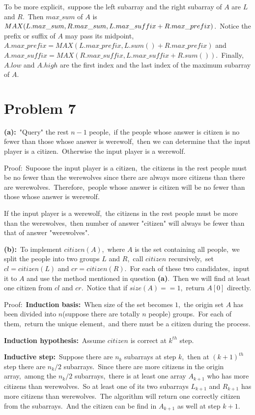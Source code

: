 \documentclass[]{article}
\begin{document}
	To be more explicit,\ suppose the left subarray and the right subarray of $A$ are $L$ and $R$.\ Then $max\_sum$ of $A$ is $MAX(L.max\_sum, R.max\_sum,\\L.max\_suffix+R.max\_prefix)$.\ Notice the prefix or suffix of $A$ may pass its midpoint,\\$A.max\_prefix = MAX(L.max\_prefix, L.sum()+R.max\_prefix)$ and \\$A.max\_suffix = MAX(R.max\_suffix, L.max\_suffix+R.sum())$.\ Finally,\ $A.low$ and $A.high$ are the first index and the last index of the maximum subarray of $A$. 
	
	\section{Problem 7}
	\textbf{(a):}\ "Query" the rest $n-1$ people,\ if the people whose answer is citizen is no fewer than those whose answer is werewolf,\ then we can determine that the input player is a citizen.\ Otherwise the input player is a werewolf.
	
	Proof:\  Supoose the input player is a citizen,\ the citizens in the rest people must be no fewer than the werewolves since there are always more citizens than there are werewolves.\ Therefore,\ people whose answer is citizen will be no fewer than those whose answer is werewolf.
	
	If the input player is a werewolf,\ the citizens in the rest people must be more than the werewolves,\ then number of answer "citizen" will always be fewer than that of answer "werewolves". 

	\textbf{(b):}\ To implement $citizen(A)$,\ where $A$ is the set containing all people,\ we split the people into two groups $L$ and $R$,\ call $citizen$ recursively,\ set $cl = citizen(L)$ and $cr = citizen(R)$.\ For each of these two candidates,\ input it to $A$ and use the method mentioned in question \textbf{(a)}.\ Then we will find at least one citizen from $cl$ and $cr$.\ Notice that if $size(A)==1$,\ return $A[0]$ directly.
	
	Proof:\ \textbf{Induction basis:}\ When size of the set becomes $1$,\ the origin set $A$ has been divided into $n$(suppose there are totally $n$ people) groups.\ For each of them,\ return the unique element,\ and there must be a citizen during the process.
	
	\textbf{Induction hypothesis:}\ Assume $citizen$ is correct at $k^{th}$ step.
	
	\textbf{Inductive step:}\ Suppose there are $n_k$ subarrays at step $k$,\ then at $(k+1)^{th}$ step there are $n_k/2$ subarrays.\ Since there are more citizens in the origin array,\ among the $n_k/2$ subarrays,\ there is at least one array $A_{k+1}$ who has more citizens than werewolves.\ So at least one of its two subarrays $L_{k+1}$ and $R_{k+1}$ has more citizens than werewolves.\ The algorithm will return one correctly citizen from the subarrays.\ And the citizen can be find in $A_{k+1}$ as well at step $k+1$. 
	
\end{document}
